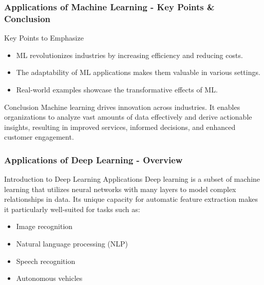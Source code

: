 \documentclass[aspectratio=169]{beamer}
\begin{document}
\begin{frame}[fragile]
    \frametitle{Applications of Machine Learning - Key Points & Conclusion}
    \begin{block}{Key Points to Emphasize}
        \begin{itemize}
            \item ML revolutionizes industries by increasing efficiency and reducing costs.
            \item The adaptability of ML applications makes them valuable in various settings.
            \item Real-world examples showcase the transformative effects of ML.
        \end{itemize}
    \end{block}
    \begin{block}{Conclusion}
        Machine learning drives innovation across industries. It enables organizations to analyze vast amounts of data effectively and derive actionable insights, resulting in improved services, informed decisions, and enhanced customer engagement.
    \end{block}
\end{frame}

\begin{frame}[fragile]
    \frametitle{Applications of Deep Learning - Overview}
    \begin{block}{Introduction to Deep Learning Applications}
        Deep learning is a subset of machine learning that utilizes neural networks with many layers to model complex relationships in data. Its unique capacity for automatic feature extraction makes it particularly well-suited for tasks such as:
    \end{block}
    \begin{itemize}
        \item Image recognition
        \item Natural language processing (NLP)
        \item Speech recognition
        \item Autonomous vehicles
    \end{itemize}
\end{frame}
\end{document}
